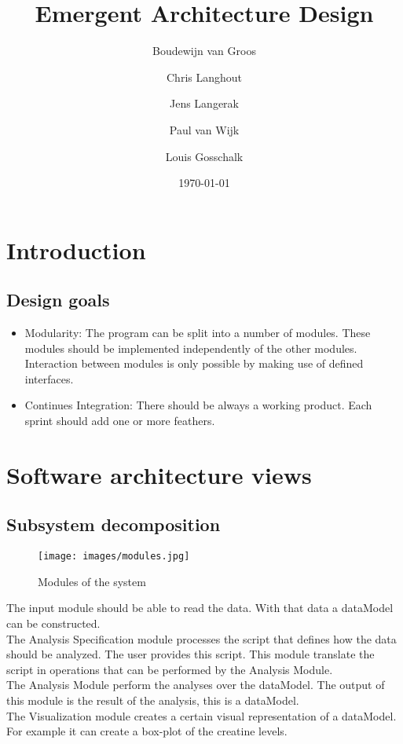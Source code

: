 \documentclass[a4paper]{article}
\title{Emergent Architecture Design}
\author[1]{Boudewijn van Groos}
\author[2]{Chris Langhout}
\author[3]{Jens Langerak}
\author[4]{Paul van Wijk}
\author[5]{Louis Gosschalk}
\affil[1]{bvangroos \\
4229843}
\affil[2]{clanghout \\
4281705}
\affil[3]{jlangerak \\
4317327}
\affil[4]{pjvanwijk \\
4285034}
\affil[5]{lgosschalk \\
4214528}
\date{\today}
\begin{document}
\maketitle
\tableofcontents
\newpage

\section{Introduction}
\subsection{Design goals}
 	\begin{itemize}
    \item Modularity:
    The program can be split into a number of modules. These modules should be implemented independently of the other modules. Interaction between modules is only possible by making use of defined interfaces.
    \item Continues Integration: There should be always a working product. Each sprint should add one or more feathers. 
		\end{itemize}

\section{Software architecture views}
\subsection{Subsystem decomposition}

\begin{figure}[h]
	\centering
   	\texttt{[image: images/modules.jpg]}
    \caption{Modules of the system}
    \label{fig:modules}
\end{figure}
The input module should be able to read the data. With that data a dataModel can be constructed. \\
The Analysis Specification module processes the script that defines how the data should be analyzed. The user provides this script. This module translate the script in operations that can be performed by the Analysis Module.\\
The Analysis Module perform the analyses over the dataModel. The output of this module is the result of the analysis, this is a dataModel.\\
The Visualization module creates a certain visual representation of a dataModel. For example it can create a box-plot of the creatine levels.
\end{document}
